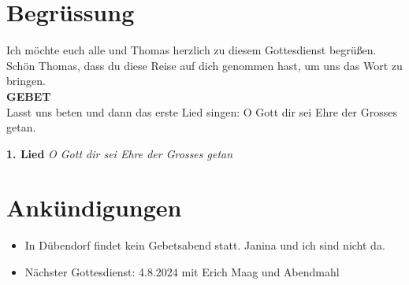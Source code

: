
\section{Begrüssung}

Ich möchte euch alle und Thomas herzlich zu diesem Gottesdienst begrüßen. Schön Thomas, dass du diese Reise auf dich genommen hast, um uns das Wort zu bringen. \\
\textbf{GEBET}\\
Lasst uns beten und dann das erste Lied singen: O Gott dir sei Ehre der Grosses getan.

\textbf{1. Lied}
\textit{O Gott dir sei Ehre der Grosses getan}

\section{Ankündigungen}
\begin{itemize}
    \item In Dübendorf findet kein Gebetsabend statt. Janina und ich sind nicht da. 
    \item Nächster Gottesdienst: 4.8.2024 mit Erich Maag und Abendmahl    
\end{itemize}


